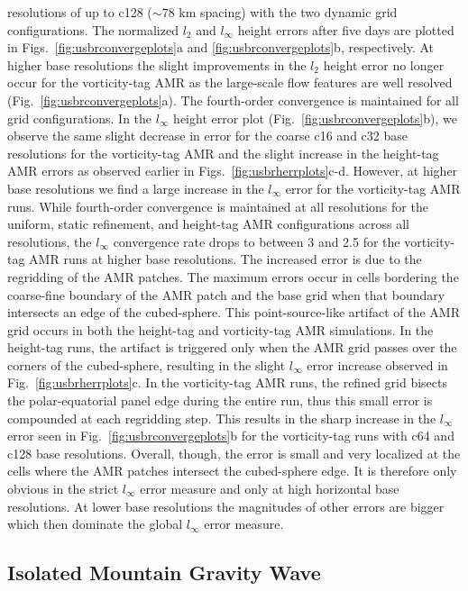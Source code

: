 resolutions of up to c128 ($\sim 78$ km spacing) with the two dynamic grid configurations.  The
normalized $l_2$ and $l_\infty$ height errors after five days are
plotted in 
Figs.~\ref{fig:usbrconvergeplots}a and
\ref{fig:usbrconvergeplots}b, respectively.  At higher base resolutions the slight
improvements in the $l_2$ height error no longer occur for the vorticity-tag AMR as the
large-scale flow features are well resolved (Fig.~\ref{fig:usbrconvergeplots}a).  The fourth-order
convergence is maintained for all grid configurations.  In the $l_\infty$
height error plot
(Fig.~\ref{fig:usbrconvergeplots}b), we observe the same slight decrease in
error for the coarse c16 and c32 base resolutions for the vorticity-tag
AMR and the slight increase in the height-tag AMR errors as observed earlier in
Figs.~\ref{fig:usbrherrplots}c-d.
However, at higher base resolutions we find a
large increase in the $l_\infty$ error for the vorticity-tag AMR runs.  While
fourth-order convergence is maintained at all resolutions for the uniform, static
refinement, and height-tag AMR configurations across all resolutions,
the $l_\infty$ convergence rate drops to between 3 and 2.5 for the vorticity-tag
AMR runs at higher base resolutions.  The increased error is due to the
regridding of the AMR patches.  The maximum errors occur in cells bordering
the coarse-fine boundary of the AMR patch and the base grid when that
boundary intersects an edge of the cubed-sphere.  This point-source-like
artifact of the AMR grid occurs in both the height-tag and vorticity-tag
AMR simulations.  In the height-tag runs, the artifact is triggered only
when the AMR grid passes over the corners of the cubed-sphere,
resulting in the slight $l_\infty$ error increase observed in 
Fig.~\ref{fig:usbrherrplots}c.  In the vorticity-tag AMR runs, the refined
grid bisects the polar-equatorial panel edge during the entire run, thus
this small error is compounded at each regridding step.  This results in
the sharp increase in the $l_\infty$ error seen in 
Fig.~\ref{fig:usbrconvergeplots}b for the vorticity-tag runs with c64 and
c128 base resolutions.  Overall, though, the error is small and very
localized at the cells where the AMR patches intersect the cubed-sphere
edge. It is therefore only obvious in the strict $l_\infty$ error measure and only at 
high horizontal base resolutions. At lower base resolutions the magnitudes of other errors are
bigger which then dominate the global $l_\infty$ error measure.


\subsection{Isolated Mountain Gravity Wave}
\label{subsec:gravity-wave}

